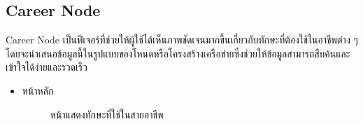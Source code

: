 \subsection {Career Node}
Career Node เป็นฟีเจอร์ที่ช่วยให้ผู้ใช้ได้เห็นภาพชัดเจนมากขึ้นเกี่ยวกับทักษะที่ต้องใช้ในอาชีพต่าง ๆ โดยจะนำเสนอข้อมูลนี้ในรูปแบบของโหนดหรือโครงสร้างเครือข่ายซึ่งช่วยให้ข้อมูลสามารถสืบค้นและเข้าใจได้ง่ายและรวดเร็ว\begin{itemize}
    \item หน้าหลัก
          \begin{figure}[H]\centering
              \setlength{\fboxrule}{0.2mm} %
              \setlength{\fboxsep}{0.5cm}
              \caption{\centering หน้าแสดงทักษะที่ใช้ในสายอาชีพ}\label{fig:wireframe4_1}
          \end{figure}
\end{itemize}

